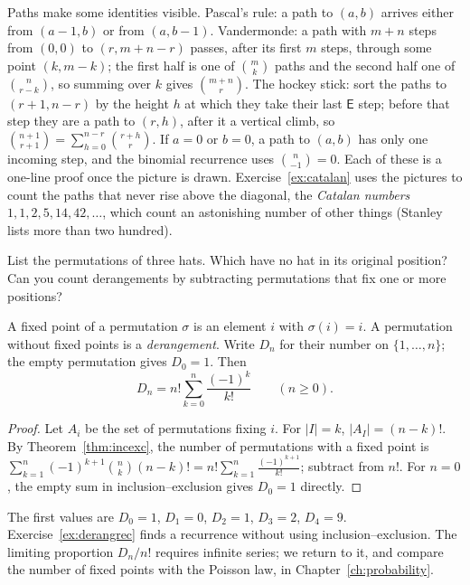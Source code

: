Paths make some identities visible. Pascal's rule: a path to $(a,b)$ arrives either from $(a-1,b)$ or from $(a,b-1)$. Vandermonde: a path
with $m+n$ steps from $(0,0)$ to $(r,m+n-r)$ passes, after its first $m$ steps, through some point $(k,m-k)$; the first half is one of $\binom mk$
paths and the second half one of $\binom n{r-k}$, so summing over $k$ gives $\binom{m+n}r$. The hockey stick: sort the paths to $(r+1,n-r)$ by
the height $h$ at which they take their last $\mathsf E$ step; before that step they are a path to $(r,h)$, after it a vertical climb, so
$\binom{n+1}{r+1}=\sum_{h=0}^{n-r}\binom{r+h}r$. If $a=0$ or $b=0$, a path to $(a,b)$ has only one incoming step, and the binomial recurrence uses $\binom n{-1}=0$. Each of these is a one-line proof once the picture is drawn. Exercise~\ref{ex:catalan} uses the
pictures to count the paths that never rise above the diagonal, the \emph{Catalan numbers} $1,1,2,5,14,42,\dots$, which count an astonishing number
of other things (Stanley lists more than two hundred).


\begin{think}
List the permutations of three hats. Which have no hat in its original position? Can you count derangements by subtracting permutations that fix one or more positions?
\end{think}

\begin{proposition}[derangements]\label{prop:derang}
A fixed point of a permutation $\sigma$ is an element $i$ with $\sigma(i)=i$. A permutation without fixed points is a \emph{derangement}. Write $D_n$ for their number on $\{1,\dots,n\}$; the empty permutation gives $D_0=1$. Then
\[
D_n=n!\sum_{k=0}^n\frac{(-1)^k}{k!}\qquad(n\ge0).
\]
\end{proposition}
\begin{proof}
Let $A_i$ be the set of permutations fixing $i$. For $|I|=k$, $|A_I|=(n-k)!$. By Theorem~\ref{thm:incexc}, the number of permutations with a fixed point is
$\sum_{k=1}^n(-1)^{k+1}\binom nk(n-k)!=n!\sum_{k=1}^n\frac{(-1)^{k+1}}{k!}$; subtract from $n!$. For $n=0$, the empty sum in inclusion--exclusion gives $D_0=1$ directly.
\end{proof}


The first values are $D_0=1$, $D_1=0$, $D_2=1$, $D_3=2$, $D_4=9$. Exercise~\ref{ex:derangrec} finds a recurrence without using inclusion--exclusion. The limiting proportion $D_n/n!$ requires infinite series; we return to it, and compare the number of fixed points with the Poisson law, in Chapter~\ref{ch:probability}.

